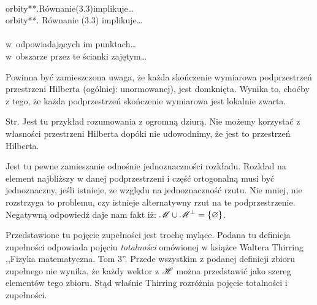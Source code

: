 \documentclass[a4paper,11pt]{article}
\begin{document}
\noindent
{} \\
\Jest  orbity**.Równanie(3.3)implikuje\ldots \\
\Powin orbity**. Równanie (3.3) implikuje\ldots \\
 \\
\Jest  w~odpowiadających im punktach\ldots  \\
\Powin w~obszarze przez te ścianki zajętym\ldots \\


\vspace{\spaceTwo}














Powinna być zamieszczona uwaga, że każda skończenie wymiarowa
podprzestrzeń przestrzeni Hilberta (ogólniej: unormowanej), jest
domknięta. Wynika to, choćby z tego, że każda podprzestrzeń
skończenie wymiarowa jest lokalnie zwarta.

\vspace{\spaceFour}



Str. Jest tu przykład rozumowania z ogromną dziurą. Nie możemy
korzystać z własności przestrzeni Hilberta dopóki nie udowodnimy, że
jest to przestrzeń Hilberta.

\vspace{\spaceFour}



 Jest tu pewne zamieszanie odnośnie jednoznaczności
rozkładu. Rozkład na element najbliższy w danej podprzestrzeni i
część ortogonalną musi być jednoznaczny, jeśli istnieje, ze względu
na jednoznaczność rzutu. Nie mniej, nie rozstrzyga to problemu, czy
istnieje alternatywny rzut na te podprzestrzenie. Negatywną odpowiedź
daje nam fakt iż:
$\mathcal{M} \cup \mathcal{M}^{ \bot } = \{ \varnothing \}$.

\vspace{\spaceFour}



 Przedstawione tu pojęcie zupełności jest trochę
mylące. Podana tu definicja zupełności odpowiada pojęciu
\textit{totalności} omówionej w książce Waltera Thirring ,,Fizyka
matematyczna. Tom 3''. Przede wszystkim z podanej definicji zbioru
zupełnego nie wynika, że każdy wektor z $\mathcal{H}$ można
przedstawić jako szereg elementów tego zbioru. Stąd właśnie Thirring
rozróżnia pojęcie totalności i zupełności.
\end{document}
